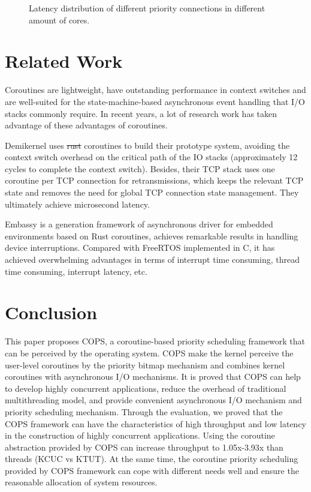 \documentclass[sigconf,review,anonymous]{acmart}
\providecommand{\DIFadd}[1]{{\protect\color{blue}\uwave{#1}}} %
\providecommand{\DIFdel}[1]{{\protect\color{red}\sout{#1}}}                      %
\providecommand{\DIFaddbegin}{} %
\providecommand{\DIFaddend}{} %
\providecommand{\DIFdelbegin}{} %
\providecommand{\DIFdelend}{} %
\begin{document}
\begin{figure}[ht]
{    }
    \caption{Latency distribution of different priority connections in different amount of cores.}
    \label{fig:prio-cores}
\end{figure}

\section{Related Work}
\DIFaddbegin \label{section: Related Work}
\DIFaddend 

Coroutines are lightweight, have outstanding performance in context switches and are well-suited for the state-machine-based asynchronous event handling that I/O stacks commonly require. In recent years, a lot of research work has taken advantage of these advantages of coroutines.

Demikernel\cite{zhang_demikernel_2021} uses \DIFdelbegin \DIFdel{rust }\DIFdelend \DIFaddbegin \DIFadd{Rust }\DIFaddend coroutines to build their prototype system, avoiding the context switch overhead on the critical path of the IO stacks (approximately 12 cycles to complete the context switch). Besides, their TCP stack uses one coroutine per TCP connection for retransmissions, which keeps the relevant TCP state and removes the need for global TCP connection state management. They ultimately achieve microsecond latency.

Embassy\cite{embassy} is a generation framework of asynchronous driver for embedded environments based on Rust coroutines, achieves remarkable results in handling device interruptions. Compared with FreeRTOS implemented in C, it has achieved overwhelming advantages in terms of interrupt time consuming, thread time consuming, interrupt latency, etc.

\section{Conclusion}
\DIFaddbegin \label{section: Conclusion}
\DIFaddend 

This paper proposes COPS, a coroutine-based priority scheduling framework that can be perceived by the operating system. COPS make the kernel perceive the user-level coroutines by the priority bitmap mechanism and combines kernel coroutines with asynchronous I/O mechanisms. It is proved that COPS can help to develop highly concurrent applications, reduce the overhead of traditional multithreading model, and provide convenient asynchronous I/O mechanism and priority scheduling mechanism. Through the evaluation, we proved that the COPS framework can have the characteristics of high throughput and low latency in the construction of highly concurrent applications. Using the coroutine abstraction provided by COPS can increase throughput to 1.05x-3.93x than threads (KCUC vs KTUT). At the same time, the coroutine priority scheduling provided by COPS framework can cope with different needs well and ensure the reasonable allocation of system resources.
\end{document}
